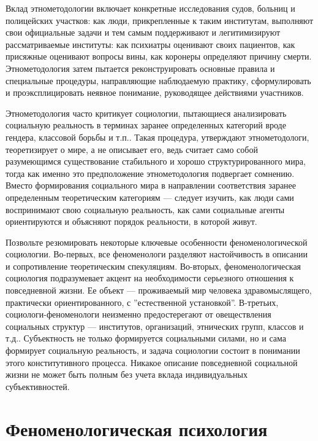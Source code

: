\documentclass[11pt]{book}
\begin{document}
Вклад этнометодологии включает конкретные исследования судов, больниц и полицейских участков: как люди, прикрепленные к таким институтам, выполняют свои официальные задачи и тем самым поддерживают и легитимизируют рассматриваемые институты: как психиатры оценивают своих пациентов, как присяжные оценивают вопросы вины, как коронеры определяют причину смерти. Этнометодология затем пытается реконструировать основные правила и специальные процедуры, направляющие наблюдаемую практику, сформулировать и проэксплицировать неявное понимание, руководящее действиями участников.

Этнометодология часто критикует социологии, пытающиеся анализировать социальную реальность в терминах заранее определенных категорий вроде гендера, классовой борьбы и т.п.. Такая процедура, утверждают этнометодологи, теоретизирует о мире, а не описывает его, ведь считает само собой разумеющимся существование стабильного и хорошо структурированного мира, тогда как именно это предположение этнометодология подвергает сомнению. Вместо формирования социального мира в направлении соответствия заранее определенным теоретическим категориям --- следует изучить, как люди сами воспринимают свою социальную реальность, как сами социальные агенты ориентируются и объясняют порядок реальности, в которой живут.

Позвольте резюмировать некоторые ключевые особенности феноменологической социологии. Во-первых, все феноменологи разделяют настойчивость в описании и сопротивление теоретическим спекуляциям. Во-вторых, феноменологическая социология подразумевает акцент на необходимости серьезного отношения к повседневной жизни. Ее объект --- проживаемый мир человека здравомыслящего, практически ориентированного, с ''естественной установкой''. В-третьих, социологи-феноменологи неизменно предостерегают от овеществления социальных структур --- институтов, организаций, этнических групп, классов и т.д.. Субъектность не только формируется социальными силами, но и сама формирует социальную реальность, и задача социологии состоит в понимании этого конститутивного процесса. Никакое описание повседневной социальной жизни не может быть полным без учета вклада индивидуальных субъективностей.

\chapter{Феноменологическая психология}
\end{document}
